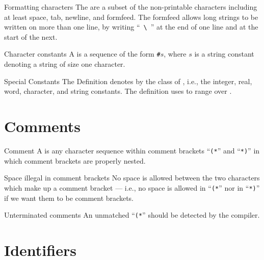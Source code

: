 \begin{definition}{Formatting characters}\label{defn:syntax-core:formatting-characters}
The  are a subset of the non-printable
characters including at least space, tab, newline, and formfeed. The
formfeed allows long strings to be written on more than one line, by
writing ``~\verb+\+~'' at the end of one line and at the start of the next.
\end{definition}

\begin{definition}{Character constants}
A  is a sequence of the form
\texttt{\#}$s$, where $s$ is a string constant denoting a string of
size one character.
\end{definition}

\begin{definition}{Special Constants}
The Definition denotes by {\SCon} the class of ,
i.e., the integer, real, word, character, and string constants. The
definition uses {\scon} to range over \SCon.
\end{definition}

\section{Comments}

\begin{definition}{Comment}\label{defn:syntax-core:comment}
A  is any character sequence within comment brackets
``\texttt{(*}'' and ``\texttt{*)}'' in which comment brackets are
properly nested.
\end{definition}

\begin{clause}{Space illegal in comment brackets}
No space is allowed between the two characters which make up a comment
bracket --- i.e., no space is allowed in ``\texttt{(*}'' nor in
``\texttt{*)}'' if we want them to be comment brackets.
\end{clause}

\begin{clause}{Unterminated comments}
An unmatched ``\texttt{(*}'' should be detected by the compiler.
\end{clause}

\section{Identifiers}

